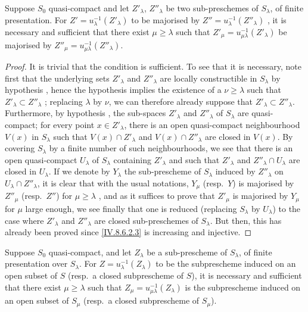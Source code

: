 \begin{corollary}[8.6.3.1]
\label{IV.8.6.3.1}
Suppose $S_0$ quasi-compact and let $Z'_\lambda$, $Z''_\lambda$ be two sub-preschemes of $S_\lambda$, of finite presentation.
For $Z'=u_\lambda^{-1}(Z'_\lambda)$ to be majorised by $Z''=u_\lambda^{-1}(Z''_\lambda)$ , it is necessary and sufficient that there exist $\mu\geqslant\lambda$ such that $Z'_\mu=u_{\mu\lambda}^{-1}(Z'_\lambda)$ be majorised by $Z''_\mu=u_{\mu\lambda}^{-1}(Z''_\lambda)$.
\end{corollary}

\begin{proof}
It is trivial that the condition is sufficient.
To see that it is necessary, note first that the underlying sets $Z'_\lambda$ and $Z''_\lambda$ are locally constructible in $S_\lambda$ by hypothesis , hence the hypothesis implies the existence of a $\nu\geqslant\lambda$ such that $Z'_\lambda\subset Z''_\lambda$ ; replacing $\lambda$ by $\nu$, we can therefore already suppose that $Z'_\lambda\subset Z''_\lambda$.
Furthermore, by hypothesis , the sub-spaces $Z'_\lambda$ and $Z''_\lambda$ of $S_\lambda$ are quasi-compact; for every point $x\in Z'_\lambda$, there is an open quasi-compact neighbourhood $V(x)$ in $S_\lambda$ such that $V(x)\cap Z'_\lambda$ and $V(x)\cap Z''_\lambda$ are closed in $V(x)$.
By covering $S_\lambda$ by a finite number of such neighbourhoods, we see that there is an open quasi-compact $U_\lambda$ of $S_\lambda$ containing $Z'_\lambda$ and such that $Z'_\lambda$ and $Z''_\lambda\cap U_\lambda$ are closed in $U_\lambda$.
If we denote by $Y_\lambda$ the sub-prescheme of $S_\lambda$ induced by $Z''_\lambda$ on $U_\lambda\cap Z''_\lambda$, it is clear that with the usual notations, $Y_\mu$ (resp.\ $Y$) is majorised by $Z''_\mu$ (resp.\ $Z''$) for $\mu\geqslant\lambda$ , and as it suffices to prove that $Z'_\mu$ is majorised by $Y_\mu$ for $\mu$
large enough, we see finally that one is reduced (replacing $S_\lambda$ by $U_\lambda$) to the case where $Z'_\lambda$ and $Z''_\lambda$ are closed sub-preschemes of $S_\lambda$.
But then, this has already been proved since \eqref{IV.8.6.2.3} is increasing and injective.
\end{proof}

\begin{corollary}[8.6.4]
\label{IV.8.6.4}
Suppose $S_0$ quasi-compact, and let $Z_\lambda$ be a sub-prescheme of $S_\lambda$, of finite presentation over $S_\lambda$.
For $Z=u_\lambda^{-1}(Z_\lambda)$ to be the subprescheme induced on an open subset of $S$ (resp.\ a closed subprescheme of $S$), it is necessary and sufficient that there exist $\mu\geqslant\lambda$ such that $Z_\mu=u_{\mu\lambda}^{-1}(Z_\lambda)$ is the subprescheme induced on an open subset of $S_\mu$ (resp.\ a closed subprescheme of $S_\mu$).
\end{corollary}


